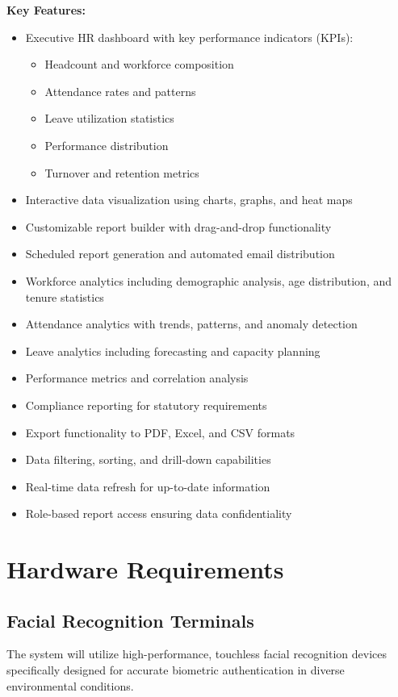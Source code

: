 \documentclass[12pt]{article}
\begin{document}
\textbf{Key Features:}
\begin{itemize}[noitemsep]
\item Executive HR dashboard with key performance indicators (KPIs):
  \begin{itemize}
  \item Headcount and workforce composition
  \item Attendance rates and patterns
  \item Leave utilization statistics
  \item Performance distribution
  \item Turnover and retention metrics
  \end{itemize}
\item Interactive data visualization using charts, graphs, and heat maps
\item Customizable report builder with drag-and-drop functionality
\item Scheduled report generation and automated email distribution
\item Workforce analytics including demographic analysis, age distribution, and tenure statistics
\item Attendance analytics with trends, patterns, and anomaly detection
\item Leave analytics including forecasting and capacity planning
\item Performance metrics and correlation analysis
\item Compliance reporting for statutory requirements
\item Export functionality to PDF, Excel, and CSV formats
\item Data filtering, sorting, and drill-down capabilities
\item Real-time data refresh for up-to-date information
\item Role-based report access ensuring data confidentiality
\end{itemize}

\section{Hardware Requirements}

\subsection{Facial Recognition Terminals}

The system will utilize high-performance, touchless facial recognition devices specifically designed for accurate biometric authentication in diverse environmental conditions.
\end{document}
